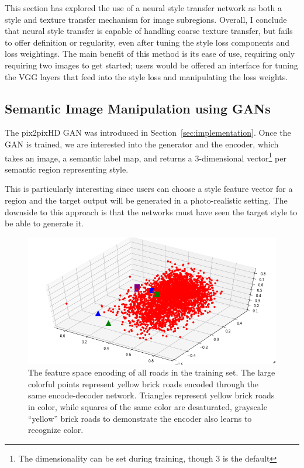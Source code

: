 \documentclass[10pt,twocolumn,letterpaper]{article}
\begin{document}
This section has explored the use of a neural style transfer network as both a style and texture transfer mechanism for image subregions. Overall, I conclude that neural style transfer is capable of handling coarse texture transfer, but fails to offer definition or regularity, even after tuning the style loss components and loss weightings. The main benefit of this method is its ease of use, requiring only requiring two images to get started; users would be offered an interface for tuning the VGG layers that feed into the style loss and manipulating the loss weights.





\subsection{Semantic Image Manipulation using GANs}

The pix2pixHD GAN was introduced in Section~\ref{sec:implementation}. Once the GAN is trained, we are interested into the generator and the encoder, which takes an image, a semantic label map, and returns a 3-dimensional vector\footnote{The dimensionality can be set during training, though 3 is the default} per semantic region representing style.

This is particularly interesting since users can choose a style feature vector for a region and the target output will be generated in a photo-realistic setting. The downside to this approach is that the networks must have seen the target style to be able to generate it. 


\begin{figure}[htb]
	\includegraphics[width=\hsize]{images/feature_space.png}
	\caption{The feature space encoding of all roads in the training set. The large colorful points represent yellow brick roads encoded through the same encode-decoder network. Triangles represent yellow brick roads in color, while squares of the same color are desaturated, grayscale ``yellow'' brick roads to demonstrate the encoder also learns to recognize color.}
	\label{fig:feature_space}
\end{figure}
\end{document}
